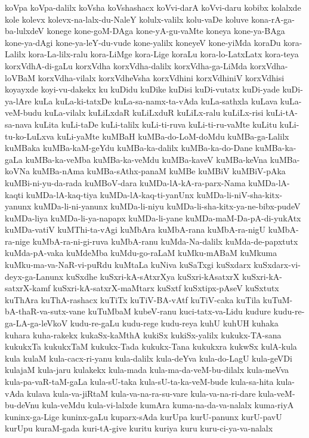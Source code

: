 {koVpa
koVpa-dalilx
koVsha
koVshashacx
koVvi-darA
koVvi-daru
kobibx
kolalxde
kole
kolevx
kolevx-na-lalx-du-NaleY
kolulx-valilx
kolu-vaDe
koluve
kona-rA-ga-ba-lulxdeV
konege
kone-goM-DAga
kone-yA-gu-vaMte
koneya
kone-ya-BAga
kone-ya-dAgi
kone-ya-leY-du-vude
kone-yalilx
koneyeV
kone-yiMda
koraDu
kora-Lalilx
kora-La-lilx-ralu
kora-LiMge
kora-Lige
koraLu
kora-lo-LatxLatx
kora-teya
korxVdhA-di-gaLu
korxVdha
korxVdha-dalilx
korxVdha-ga-LiMda
korxVdha-loVBaM
korxVdha-vilalx
korxVdheVsha
korxVdhini
korxVdhiniV
korxVdhisi
koyayxde
koyi-vu-dakekx
ku
kuDidu
kuDike
kuDisi
kuDi-vutatx
kuDi-yade
kuDi-ya-lAre
kuLa
kuLa-ki-tatxDe
kuLa-sa-namx-ta-vAda
kuLa-sathxla
kuLava
kuLa-veM-budu
kuLa-vilalx
kuLiLxdaR
kuLiLxduR
kuLiLx-ralu
kuLiLx-risi
kuLi-tA-sa-nava
kuLita
kuLi-taDe
kuLi-talilx
kuLi-ti-ruva
kuLi-ti-ru-vaMte
kuLitu
kuLi-tu-ko-LuLxva
kuLi-yaMte
kuMBaH
kuMBa-do-LoM-doMdu
kuMBa-ga-Lalilx
kuMBaka
kuMBa-kaM-geYdu
kuMBa-ka-dalilx
kuMBa-ka-do-Dane
kuMBa-ka-gaLa
kuMBa-ka-veMba
kuMBa-ka-veMdu
kuMBa-kaveV
kuMBa-keVna
kuMBa-koVNa
kuMBa-nAma
kuMBa-sAthx-panaM
kuMBe
kuMBiV
kuMBiV-pAka
kuMBi-ni-yu-da-rada
kuMBoV-dara
kuMDa-lA-kA-ra-parx-Nama
kuMDa-lA-kaqti
kuMDa-lA-kaq-tiya
kuMDa-lA-kaq-ti-yanUnx
kuMDa-li-niV-sha-kitx-yanunx
kuMDa-li-ni-yanunx
kuMDa-li-niyu
kuMDa-li-sha-kitx-ya-ne-bibx-pudeV
kuMDa-liya
kuMDa-li-ya-napapx
kuMDa-li-yane
kuMDa-maM-Da-pA-di-yukAtx
kuMDa-vatiV
kuMThi-ta-vAgi
kuMbAra
kuMbA-rana
kuMbA-ra-nigU
kuMbA-ra-nige
kuMbA-ra-ni-gi-ruva
kuMbA-ranu
kuMda-Na-dalilx
kuMda-de-papxtutx
kuMda-pA-vaka
kuMdeMba
kuMdu-go-raLaM
kuMku-mABaM
kuMkuma
kuMku-ma-va-NaR-vi-puRdu
kuMtaLa
kuNiva
kuSaTxgi
kuSxdarx
kuSxdarx-vi-deyx-ga-Lanunx
kuSxdhe
kuSxri-kA-sAtxrXya
kuSxri-kAsatxrX
kuSxri-kA-satxrX-kamf
kuSxri-kA-satxrX-maMtarx
kuSxtf
kuSxtipx-pAseV
kuSxtutx
kuThAra
kuThA-rashacx
kuTiTx
kuTiV-BA-vAtf
kuTiV-caka
kuTila
kuTuM-bA-thaR-va-sutx-vane
kuTuMbaM
kubeV-ranu
kuci-tatx-va-Lidu
kudure
kudu-re-ga-LA-ga-leVkoV
kudu-re-gaLu
kudu-rege
kudu-reya
kuhU
kuhUH
kuhaka
kuhara
kuha-rakekx
kukaSx-kaMthA
kukiSx
kukiSx-yalilx
kukukx-TA-sana
kukukxTa
kukukxTaM
kukukx-Tada
kukukx-Tana
kukukxra
kukwSx
kulA-kula
kula
kulaM
kula-cacx-ri-yanu
kula-dalilx
kula-deYva
kula-do-LagU
kula-geVDi
kulajaM
kula-jaru
kulakekx
kula-mada
kula-ma-da-veM-bu-dilalx
kula-meVva
kula-pa-vaR-taM-gaLa
kula-sU-taka
kula-sU-ta-ka-veM-bude
kula-sa-hita
kula-vAda
kulava
kula-va-jiRtaM
kula-va-na-ra-su-vare
kula-va-na-ri-dare
kula-veM-bu-deVnu
kula-veMdu
kula-vi-lalxde
kumAra
kuma-na-da-va-nalalx
kuma-riyA
kuninx-ga-Lige
kuninx-gaLu
kuparx-sAda
kurUpa
kurU-panunx
kurU-pavU
kurUpu
kuraM-gada
kuri-tA-give
kuritu
kuriya
kuru
kuru-ci-ya-va-nalalx
}
